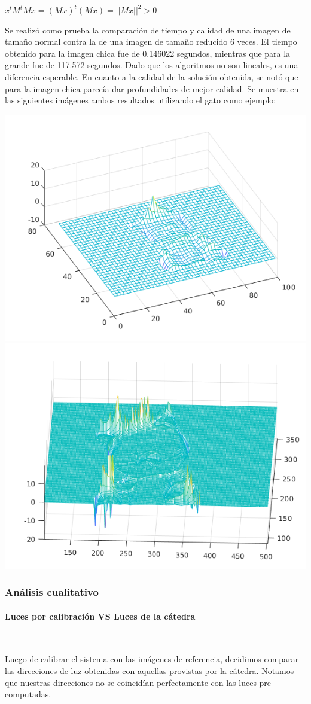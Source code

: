 \begin{center}
$x^tM^tMx = (Mx)^t(Mx) = ||Mx||^2 > 0$
\end{center}

Se realizó como prueba la comparación de tiempo y calidad de una imagen de tamaño normal contra la de una imagen de tamaño reducido 6 veces. El tiempo obtenido para la imagen chica fue de 0.146022 segundos, mientras que para la grande fue de 117.572 segundos. Dado que los algoritmos no son lineales, es una diferencia esperable. En cuanto a la calidad de la solución obtenida, se notó que para la imagen chica parecía dar profundidades de mejor calidad. Se muestra en las siguientes imágenes ambos resultados utilizando el gato como ejemplo:

\begin{center}
\includegraphics[width=.4\linewidth]{imagenes/gato_small_model_1511.png}
\includegraphics[width=.4\linewidth]{imagenes/gato_model_1511.png}
\end{center}


\subsubsection{Análisis cualitativo}

\paragraph{Luces por calibración VS Luces de la cátedra}
\

Luego de calibrar el sistema con las imágenes de referencia, decidimos comparar
las direcciones de luz obtenidas con aquellas provistas por la cátedra. Notamos
que nuestras direcciones no se coincidían perfectamente con las luces pre-computadas.

